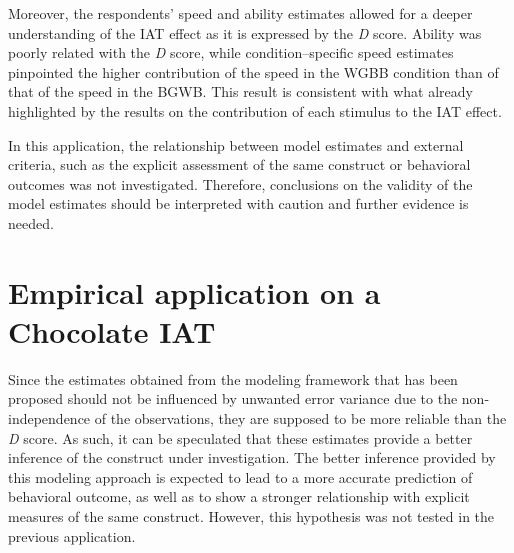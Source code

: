 \documentclass[12pt]{book}
\begin{document}
Moreover, the respondents' speed and ability estimates allowed for a deeper understanding of the IAT effect as it is expressed by the \emph{D} score. 
Ability was poorly related with the \emph{D} score, while condition--specific speed estimates pinpointed the higher contribution of the speed in the WGBB condition than of that of the speed in the BGWB.
This result is consistent with what already highlighted by the results on the contribution of each stimulus to the IAT effect.

In this application, the relationship between model estimates and external criteria, such as the explicit assessment of the same construct or behavioral outcomes was not investigated. Therefore, conclusions on the validity of the model estimates should be interpreted with caution and further evidence is needed.


\section[Chocolate IAT]{Empirical application on a Chocolate IAT}\label{sec:filling}

Since the estimates obtained from the modeling framework that has been proposed should not be influenced by unwanted error variance due to the non-independence of the observations, they are supposed to be more reliable than the \emph{D} score. As such, it can be speculated that these estimates provide a better inference of the construct under investigation. 
The better inference provided by this modeling approach is expected to lead to a more accurate prediction of behavioral outcome, as well as to show a stronger relationship with explicit measures of the same construct. However, this hypothesis was not tested in the previous application. 
\end{document}
